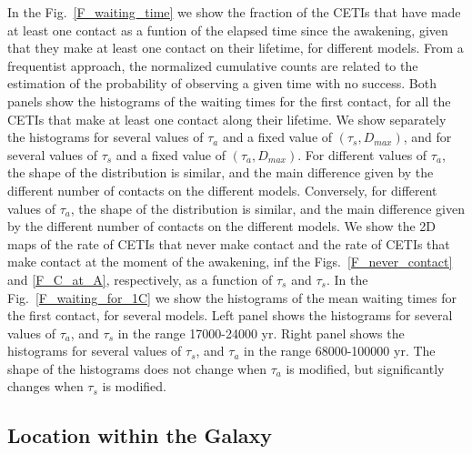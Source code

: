 \documentclass[crop]{CSLB}%
\begin{document}
In the Fig.~\ref{F_waiting_time} we show the fraction of the CETIs
that have made at least one contact as a funtion of the elapsed time
since the awakening, given that they make at least one contact on
their lifetime, for different models.
%
From a frequentist approach, the normalized cumulative counts are
related to the estimation of the probability of observing a given time
with no success.
%             
Both panels show the histograms of the waiting times for the first
contact, for all the CETIs that make at least one contact along their
lifetime.
%
We show separately the histograms for several values of $\tau_a$ and a
fixed value of $(\tau_s, D_{max})$, and for several values of $\tau_s$
and a fixed value of $(\tau_a, D_{max})$.
%
For different values of $\tau_a$, the shape of the distribution is
similar, and the main difference given by the different number of
contacts on the different models.
%
Conversely, for different values of $\tau_a$, the shape of the
distribution is similar, and the main difference given by the
different number of contacts on the different models. 
%
We show the 2D maps of the rate of CETIs that never make contact and
the rate of CETIs that make contact at the moment of the awakening,
inf the Figs.~\ref{F_never_contact} and \ref{F_C_at_A}, respectively,
as a function of $\tau_s$ and $\tau_s$.
%
In the Fig.~\ref{F_waiting_for_1C} we show the histograms of the mean
waiting times for the first contact, for several models.
%
Left panel shows the histograms for several values of $\tau_a$, and
$\tau_s$ in the range 17000-24000 yr.
%
Right panel shows the histograms for several values of $\tau_s$, and
$\tau_a$ in the range 68000-100000 yr.
%
The shape of the histograms does not change when $\tau_a$ is modified,
but significantly changes when $\tau_s$ is modified.


                   
           

\subsection{Location within the Galaxy}\label{SS_location}
    
\end{document}
